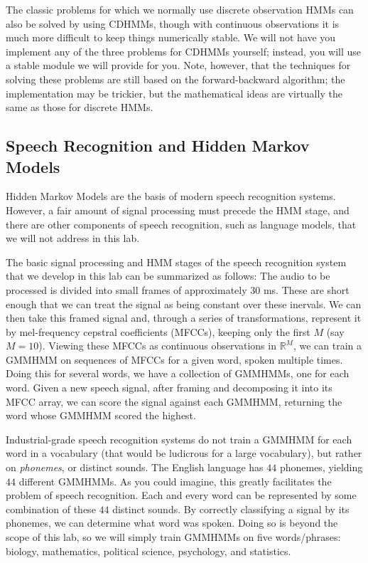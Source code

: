 The classic problems for which we normally use discrete observation HMMs can also be solved by using CDHMMs, though with continuous observations it is much more difficult to keep things numerically stable.
We will not have you implement any of the three problems for CDHMMs yourself; instead, you will use a stable module we will provide for you.
Note, however, that the techniques for solving these problems are still based on the forward-backward algorithm; the implementation may be trickier, but the mathematical
ideas are virtually the same as those for discrete HMMs.

\subsection*{Speech Recognition and Hidden Markov Models}
Hidden Markov Models are the basis of modern speech recognition systems. However, a fair amount of signal processing must precede the HMM stage, and there are other
components of speech recognition, such as language models, that we will not address in this lab.

The basic signal processing and HMM stages of the speech recognition system that we develop in this lab can be summarized as follows:
The audio to be processed is divided into small frames of approximately $30$ ms. These are short enough that we can treat the signal as being constant over these inervals. We can then take this framed signal and, through a series of transformations, represent it by mel-frequency cepstral coefficients (MFCCs), keeping only the first $M$ (say $M = 10$). Viewing these MFCCs as continuous observations in $\mathbb{R}^{M}$, we can train a GMMHMM on sequences of MFCCs for a given word, spoken multiple times. Doing this for several words, we have a collection of GMMHMMs, one for each word. Given a new speech signal, after framing and decomposing it into its MFCC array, we can score the signal against each GMMHMM, returning the word whose GMMHMM scored the highest.

Industrial-grade speech recognition systems do not train a GMMHMM for each word in a vocabulary (that would be ludicrous for a large vocabulary), but rather on \emph{phonemes}, or distinct sounds. The English language has $44$ phonemes, yielding $44$ different GMMHMMs. As you could imagine, this greatly facilitates the problem of speech recognition.  Each and every word can be represented by some combination of these $44$ distinct sounds.  By correctly classifying a signal by its phonemes, we can determine what word was spoken. Doing so is beyond the scope of this lab, so we will simply train GMMHMMs on five words/phrases: biology, mathematics, political science, psychology, and statistics.

